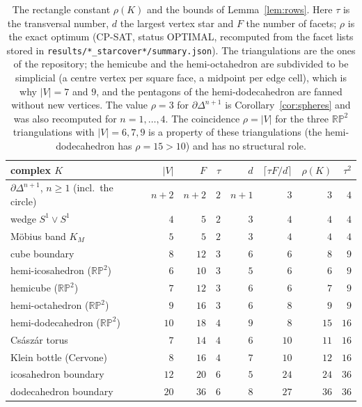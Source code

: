 \documentclass[12pt]{article}
\begin{document}
\begin{table}[H]
\centering\footnotesize
\setlength{\tabcolsep}{4pt}
\begin{tabular}{@{}lrrrrrrr@{}}
\toprule
complex $K$ & $|V|$ & $F$ & $\tau$ & $d$ &
$\lceil\tau F/d\rceil$ & $\rho(K)$ & $\tau^2$ \\
\midrule
$\partial\Delta^{n+1}$, $n\ge1$ (incl.\ the circle) & $n{+}2$ & $n{+}2$ & $2$ & $n{+}1$ & $3$ & $3$ & $4$\\
wedge $S^1\vee S^1$ & $4$ & $5$ & $2$ & $3$ & $4$ & $4$ & $4$\\
M\"obius band $K_M$ & $5$ & $5$ & $2$ & $3$ & $4$ & $4$ & $4$\\
cube boundary & $8$ & $12$ & $3$ & $6$ & $6$ & $8$ & $9$\\
hemi-icosahedron ($\mathbb{RP}^2$) & $6$ & $10$ & $3$ & $5$ & $6$ & $6$ & $9$\\
hemicube ($\mathbb{RP}^2$) & $7$ & $12$ & $3$ & $6$ & $6$ & $7$ & $9$\\
hemi-octahedron ($\mathbb{RP}^2$) & $9$ & $16$ & $3$ & $6$ & $8$ & $9$ & $9$\\
hemi-dodecahedron ($\mathbb{RP}^2$) & $10$ & $18$ & $4$ & $9$ & $8$ & $15$ & $16$\\
Cs\'asz\'ar torus & $7$ & $14$ & $4$ & $6$ & $10$ & $11$ & $16$\\
Klein bottle (Cervone) & $8$ & $16$ & $4$ & $7$ & $10$ & $12$ & $16$\\
icosahedron boundary & $12$ & $20$ & $6$ & $5$ & $24$ & $24$ & $36$\\
dodecahedron boundary & $20$ & $36$ & $6$ & $8$ & $27$ & $36$ & $36$\\
\bottomrule
\end{tabular}
\caption{The rectangle constant $\rho(K)$ and the bounds of
Lemma~\ref{lem:rows}.  Here $\tau$ is the transversal number, $d$ the
largest vertex star and $F$ the number of facets; $\rho$ is the exact
optimum (CP-SAT, status OPTIMAL, recomputed from the facet lists stored
in \texttt{results/*\_starcover*/summary.json}).  The triangulations are
the ones of the repository; the hemicube and the hemi-octahedron are
subdivided to be simplicial (a centre vertex per square face, a
midpoint per edge cell), which is why $|V|=7$ and $9$, and the pentagons
of the hemi-dodecahedron are fanned without new vertices.  The value $\rho=3$ for
$\partial\Delta^{n+1}$ is Corollary~\ref{cor:spheres} and was also
recomputed for $n=1,\dots,4$.  The coincidence $\rho=|V|$ for the three
$\mathbb{RP}^2$ triangulations with $|V|=6,7,9$ is a property of these
triangulations (the hemi-dodecahedron has $\rho=15>10$) and has no
structural role.}
\label{tab:rho}
\end{table}
\end{document}
